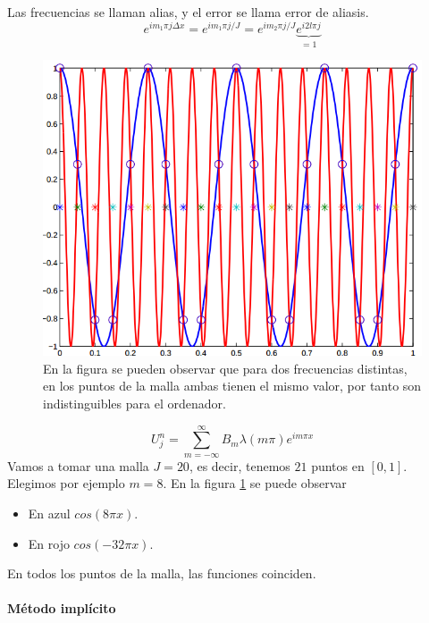 Las frecuencias se llaman alias, y el error se llama error de aliasis.
\begin{equation*}
	e^{im_1\pi j\Delta x} = e^{im_1\pi j / J} = e^{im_2\pi j / J}\underbrace{e^{i2l\pi j}}_{=1}
\end{equation*}

\begin{figure}[h]
	\centering
	\includegraphics[width=\textwidth/2]{img/frecmalla.png}
	\caption{En la figura se pueden observar que para dos frecuencias distintas, en los puntos de la malla ambas tienen el mismo valor, por tanto son indistinguibles para el ordenador.}
	\label{fig:frecmalla}
\end{figure}

 \begin{example}
 	$$U_j^n = \sum_{m=-\infty}^\infty B_m\lambda(m\pi)e^{im\pi x}$$
	Vamos a tomar una malla $J=20$, es decir, tenemos $21$ puntos en $[0,1]$.
	Elegimos por ejemplo $m=8$. En la figura \ref{fig:frecmalla} se puede observar
	\begin{itemize}
		\item En azul $cos(8\pi x)$.
		\item En rojo $cos(-32\pi x)$.
	\end{itemize}
	En todos los puntos de la malla, las funciones coinciden.
 \end{example}
 
\paragraph{Método implícito}\mbox{}


